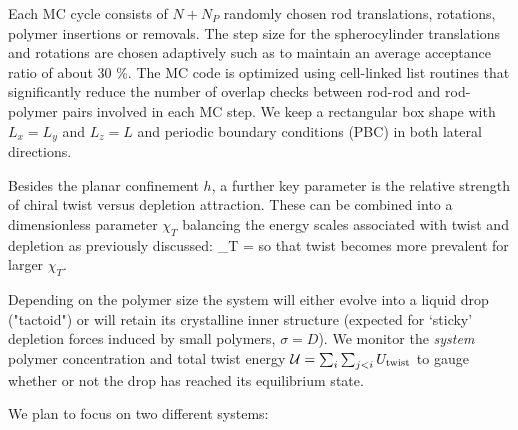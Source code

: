 Each MC cycle consists of $N + N_{P}$ randomly chosen rod translations, rotations, polymer insertions or removals. The step size for the spherocylinder translations and rotations are chosen adaptively such as to maintain an average acceptance ratio of about 30 \%. The MC code is optimized using cell-linked list routines that significantly reduce the number of overlap checks between rod-rod and rod-polymer pairs involved in  each MC step.   We keep a rectangular box shape with $L_{x} = L_{y}$ and $L_{z} = L$ and periodic boundary conditions (PBC) in both lateral directions.

Besides the planar confinement $h$, a further key parameter is the relative strength of chiral twist versus depletion attraction. These can be combined into a dimensionless parameter $\chi_{T}$ balancing the energy scales associated with twist and depletion as previously discussed:
\beq
\chi_{T} =  
\eeq
so that twist becomes more prevalent for larger $\chi_{T}$.

Depending on the polymer size the system will either evolve into a liquid drop ("tactoid") or  will retain its crystalline inner structure (expected for `sticky' depletion forces induced by small polymers, $\sigma = D$). We monitor the {\em system} polymer concentration and total twist energy $\mathcal{U}  = \sum_{i}\sum_{j<i}U_{\rm twist}$ to gauge whether or not the drop has reached its equilibrium state.

We plan to focus on two different systems:

